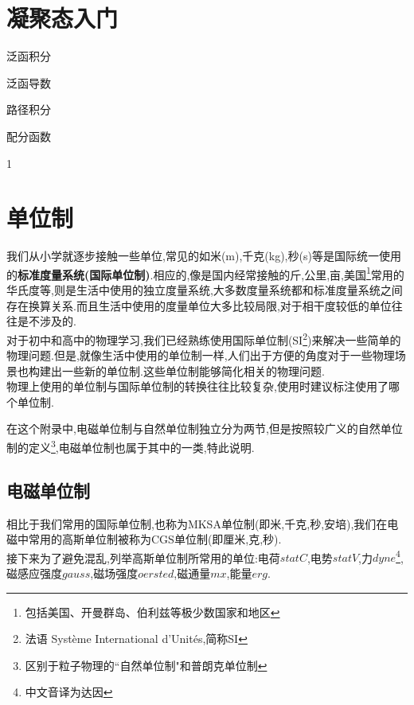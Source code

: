 \documentclass[lang=cn,newtx,10pt,scheme=chinese,thmcnt=section]{elegantbook}
\begin{document}
\chapter{凝聚态入门}
\begin{introduction}
	\item 泛函积分
	\item 泛函导数
	\item 路径积分
	\item 配分函数
\end{introduction}
1























\nocite{*}

\printbibliography[heading=bibintoc, title=\ebibname]
\appendix

\chapter{单位制}
我们从小学就逐步接触一些单位,常见的如米(m),千克(kg),秒(s)等是国际统一使用的\textbf{标准度量系统(国际单位制)}.相应的,像是国内经常接触的斤,公里,亩,美国\footnote{包括美国、开曼群岛、伯利兹等极少数国家和地区}常用的华氏度等,则是生活中使用的独立度量系统,大多数度量系统都和标准度量系统之间存在换算关系.而且生活中使用的度量单位大多比较局限,对于相干度较低的单位往往是不涉及的.\\
对于初中和高中的物理学习,我们已经熟练使用国际单位制(SI\footnote{法语 Système International d'Unités,简称SI})来解决一些简单的物理问题.但是,就像生活中使用的单位制一样,人们出于方便的角度对于一些物理场景也构建出一些新的单位制.这些单位制能够简化相关的物理问题.\\物理上使用的单位制与国际单位制的转换往往比较复杂,使用时建议标注使用了哪个单位制.\\
\begin{remark}
	在这个附录中,电磁单位制与自然单位制独立分为两节,但是按照较广义的自然单位制的定义\footnote{区别于粒子物理的``自然单位制"和普朗克单位制},电磁单位制也属于其中的一类,特此说明.
\end{remark}
\section{电磁单位制}
相比于我们常用的国际单位制,也称为MKSA单位制(即米,千克,秒,安培),我们在电磁中常用的高斯单位制被称为CGS单位制(即厘米,克,秒).\\接下来为了避免混乱,列举高斯单位制所常用的单位:电荷$statC$,电势$statV$,力$dyne$\footnote{中文音译为达因},磁感应强度$gauss$,磁场强度$oersted$,磁通量$mx$,能量$erg$.\\
\end{document}
